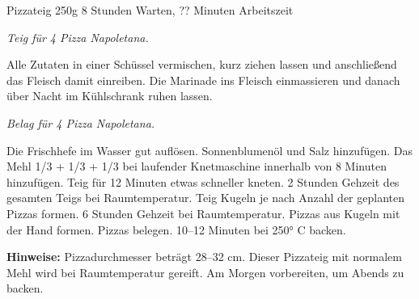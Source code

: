 \begin{recipe}{Pizzateig} {250g} {8 Stunden Warten, ?? Minuten Arbeitszeit}

  \freeform
  \textit{Teig für 4 Pizza Napoletana.}


  Alle Zutaten in einer Schüssel vermischen, kurz ziehen lassen und anschließend das Fleisch damit einreiben.
  Die Marinade ins Fleisch einmassieren und danach über Nacht im Kühlschrank ruhen lassen.

  \freeform
  \hrulefill

  \freeform
  \textit{Belag für 4 Pizza Napoletana.}


  Die Frischhefe im Wasser gut auflösen.
  Sonnenblumenöl und Salz hinzufügen.
  Das Mehl 1/3 + 1/3 + 1/3 bei laufender Knetmaschine innerhalb von 8 Minuten hinzufügen.
  Teig für 12 Minuten etwas schneller kneten.
  2 Stunden Gehzeit des gesamten Teigs bei Raumtemperatur.
  Teig Kugeln je nach Anzahl der geplanten Pizzas formen.
  6 Stunden Gehzeit bei Raumtemperatur.
  Pizzas aus Kugeln mit der Hand formen.
  Pizzas belegen.
  10–12 Minuten bei 250° C backen.

  \freeform
  \hrulefill

  \freeform
  \textbf{Hinweise:}
  Pizzadurchmesser beträgt 28–32 cm.
  Dieser Pizzateig mit normalem Mehl wird bei Raumtemperatur gereift.
  Am Morgen vorbereiten, um Abends zu backen.

\end{recipe}

